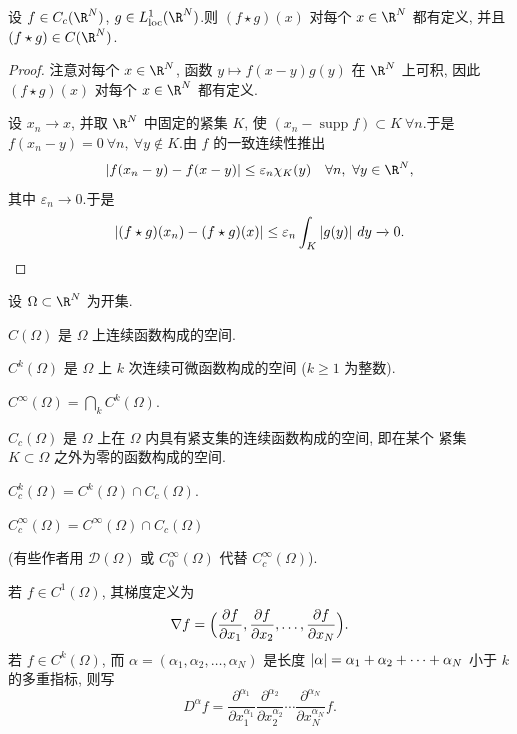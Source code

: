 \begin{proposition}
\label{prop:4.19}
设 $f\in C_c(\R^N)$, $g\in L^1_{\mathrm{loc}}(\R^N)$.则 $(f\star g)(x)$ 对每个
$x\in\R^N$ 都有定义, 并且 $(f\star g)\in C(\R^N)$.
\end{proposition}

\begin{proof}
注意对每个 $x\in\R^N$, 函数 $y\mapsto f(x-y)g(y)$ 在 $\R^N$ 上可积, 因此
$(f\star g)(x)$ 对每个 $x\in\R^N$ 都有定义.

设 $x_n\to x$, 并取 $\R^N$ 中固定的紧集 $K$, 使
$(x_n-\operatorname{supp}f)\subset K\ \forall n$.于是
$f(x_n-y)=0\ \forall n,\ \forall y\notin K$.由 $f$ 的一致连续性推出
\begin{equation*}
\abs{f(x_n-y)-f(x-y)}\le\varepsilon_n\chi_K(y)\quad\forall n,\ \forall y\in\R^N,
\end{equation*}
其中 $\varepsilon_n\to0$.于是
\begin{equation*}
\left|(f\star g)(x_n)-(f\star g)(x)\right|\le\varepsilon_n\int_K\left|g(y)\right|\,dy
\xrightarrow{\ }0.
\end{equation*}
\end{proof}

\begin{notation}
设 $\Omega\subset\R^N$ 为开集.

$C(\Omega)$ 是 $\Omega$ 上连续函数构成的空间.

$C^k(\Omega)$ 是 $\Omega$ 上 $k$ 次连续可微函数构成的空间 ($k\ge1$ 为整数).

$C^\infty(\Omega)=\bigcap_kC^k(\Omega)$.

$C_c(\Omega)$ 是 $\Omega$ 上在 $\Omega$ 内具有紧支集的连续函数构成的空间, 即在某个
紧集 $K\subset\Omega$ 之外为零的函数构成的空间.

$C_c^k(\Omega)=C^k(\Omega)\cap C_c(\Omega)$.

$C_c^\infty(\Omega)=C^\infty(\Omega)\cap C_c(\Omega)$

(有些作者用 $\mathcal{D}(\Omega)$ 或 $C_0^\infty(\Omega)$ 代替
$C_c^\infty(\Omega)$).

若 $f\in C^1(\Omega)$, 其梯度定义为
\begin{equation*}
\nabla f=\Bigl(\frac{\partial f}{\partial x_1},
\frac{\partial f}{\partial x_2},\dots,\frac{\partial f}{\partial x_N}\Bigr).
\end{equation*}
若 $f\in C^k(\Omega)$, 而 $\alpha=(\alpha_1,\alpha_2,\dots,\alpha_N)$ 是长度
$\left|\alpha\right|=\alpha_1+\alpha_2+\cdots+\alpha_N$ 小于 $k$ 的多重指标, 则写
\begin{equation*}
D^\alpha f=\frac{\partial^{\alpha_1}}{\partial x_1^{\alpha_1}}
\frac{\partial^{\alpha_2}}{\partial x_2^{\alpha_2}}\cdots
\frac{\partial^{\alpha_N}}{\partial x_N^{\alpha_N}}f.
\end{equation*}
\end{notation}

